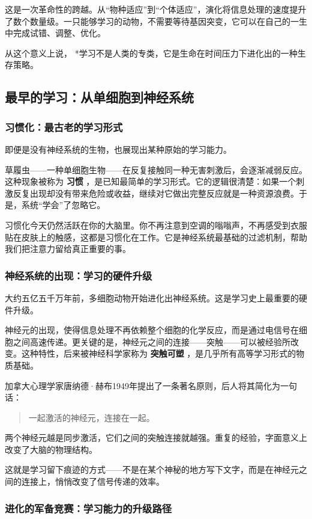 \documentclass[11pt]{article}
\begin{document}
这是一次革命性的跨越。从“物种适应”到“个体适应”，演化将信息处理的速度提升了数个数量级。一只能够学习的动物，不需要等待基因突变，它可以在自己的一生中完成试错、调整、优化。

从这个意义上说， *学习不是人类的专类，它是生命在时间压力下进化出的一种生存策略。
\subsection{最早的学习：从单细胞到神经系统}
\label{sec:org6a0be67}

\subsubsection{习惯化：最古老的学习形式}
\label{sec:org9364551}

即便是没有神经系统的生物，也展现出某种原始的学习能力。

草履虫——一种单细胞生物——在反复接触同一种无害刺激后，会逐渐减弱反应。这种现象被称为 \textbf{习惯} ，是已知最简单的学习形式。它的逻辑很清楚：如果一个刺激反复出现却没有带来危险或收益，继续对它做出完整反应就是一种资源浪费。于是，系统“学会”了忽略它。

习惯化今天仍然活跃在你的大脑里。你不再注意到空调的嗡嗡声，不再感受到衣服贴在皮肤上的触感，这都是习惯化在工作。它是神经系统最基础的过滤机制，帮助我们把注意力留给真正重要的事。
\subsubsection{神经系统的出现：学习的硬件升级}
\label{sec:org0b65494}

大约五亿五千万年前，多细胞动物开始进化出神经系统。这是学习史上最重要的硬件升级。

神经元的出现，使得信息处理不再依赖整个细胞的化学反应，而是通过电信号在细胞之间高速传递。更关键的是，神经元之间的连接——突触——可以被经验所改变。这种特性，后来被神经科学家称为 \textbf{突触可塑} ，是几乎所有高等学习形式的物质基础。

加拿大心理学家唐纳德·赫布1949年提出了一条著名原则，后人将其简化为一句话：

\begin{quote}
一起激活的神经元，连接在一起。
\end{quote}

两个神经元越是同步激活，它们之间的突触连接就越强。重复的经验，字面意义上改变了大脑的物理结构。

这就是学习留下痕迹的方式——不是在某个神秘的地方写下文字，而是在神经元之间的连接上，悄悄改变了信号传递的效率。
\subsubsection{进化的军备竞赛：学习能力的升级路径}
\label{sec:org17dacc6}
\end{document}
